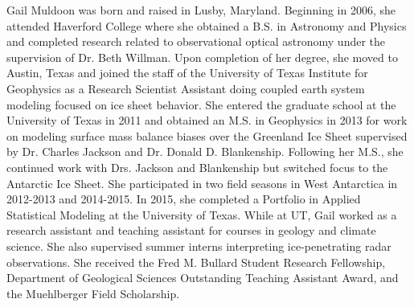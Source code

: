 \documentclass[12pt]{report}	%
\theoremstyle{definition}
\theoremstyle{remark}
\begin{document}







%
%
%
%



\begin{vita}
Gail Muldoon was born and raised in Lusby, Maryland. Beginning in 2006, she attended Haverford College where she obtained a B.S. in Astronomy and Physics and completed research related to observational optical astronomy under the supervision of Dr. Beth Willman. Upon completion of her degree, she moved to Austin, Texas and joined the staff of the University of Texas Institute for Geophysics as a Research Scientist Assistant doing coupled earth system modeling focused on ice sheet behavior. She entered the graduate school at the University of Texas in 2011 and obtained an M.S. in Geophysics in 2013 for work on modeling surface mass balance biases over the Greenland Ice Sheet supervised by Dr. Charles Jackson and Dr. Donald D. Blankenship. Following her M.S., she continued work with Drs. Jackson and Blankenship but switched focus to the Antarctic Ice Sheet. She participated in two field seasons in West Antarctica in 2012-2013 and 2014-2015. In 2015, she completed a Portfolio in Applied Statistical Modeling at the University of Texas. While at UT, Gail worked as a research assistant and teaching assistant for courses in geology and climate science. She also supervised summer interns interpreting ice-penetrating radar observations. She received the Fred M. Bullard Student Research Fellowship, Department of Geological Sciences Outstanding Teaching Assistant Award, and the Muehlberger Field Scholarship.  %
\end{vita}
\end{document}
